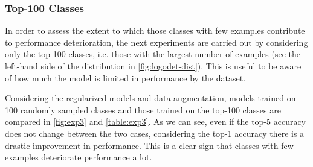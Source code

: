 \subsubsection{Top-100 Classes}
In order to assess the extent to which those classes with few examples contribute to performance deterioration, the next experiments are carried out by considering only the top-100 classes, i.e. those with the largest number of examples (see the left-hand side of the distribution in \autoref{fig:logodet-dist}). This is useful to be aware of how much the model is limited in performance by the dataset.

Considering the regularized models and data augmentation, models trained on 100 randomly sampled classes and those trained on the top-100 classes are compared in \autoref{fig:exp3} and \autoref{table:exp3}. As we can see, even if the top-5 accuracy does not change between the two cases, considering the top-1 accuracy there is a drastic improvement in performance. This is a clear sign that classes with few examples deteriorate performance a lot.

